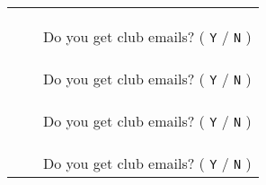 \documentclass[10pt,letterpaper]{article}
\begin{document}
\begin{center}
\begin{tabular}{|p{5cm}|p{3cm}|p{6cm}|}
  && \\ && \\ && \\ && \small{Do you get club emails? ( {\large\texttt{Y}} / {\large\texttt{N}} )} \\ \hline
  && \\ && \\ && \\ && \small{Do you get club emails? ( {\large\texttt{Y}} / {\large\texttt{N}} )} \\ \hline
  && \\ && \\ && \\ && \small{Do you get club emails? ( {\large\texttt{Y}} / {\large\texttt{N}} )} \\ \hline
  && \\ && \\ && \\ && \small{Do you get club emails? ( {\large\texttt{Y}} / {\large\texttt{N}} )} \\ \hline
\end{tabular}

\end{center}
\end{document}
